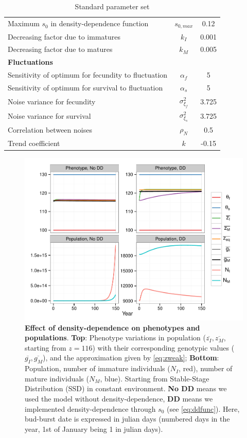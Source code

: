 \documentclass[a4paper, 12pt]{article}
\begin{document}
\begin{table}
\begin{center}
\begin{tabular}{l c c}
		Maximum $s_{0}$ in density-dependence function & $s_{0, max}$ & 0.12 \\
		Decreasing factor due to immatures & $k_{I}$ & 0.001 \\
		Decreasing factor due to matures & $k_{M}$ & 0.005 \\
		\multicolumn{3}{l}{\textbf{Fluctuations}} \\
		Sensitivity of optimum for fecundity to fluctuation & $\alpha_{f}$ & 5 \\
		Sensitivity of optimum for survival to fluctuation & $\alpha_{s}$ & 5 \\
		Noise variance for fecundity & $\sigma_{\xi_{f}}^2$ & 3.725 \\
		Noise variance for survival & $\sigma_{\xi_{s}}^2$ & 3.725 \\
		Correlation between noises & $\rho_{N}$ & 0.5 \\
		Trend coefficient & $k$ & -0.15 \\
		\hline \hline
	\end{tabular}
	\caption{Standard parameter set}
	\label{tab:params}
\end{center}
\end{table}

\begin{figure}[ht!]
	\centering
	\includegraphics[scale=1]{Figures/DDphenopop.pdf}
	\caption{\textbf{Effect of density-dependence on phenotypes and populations}. \textbf{Top}: Phenotype variations in population ($\overline{z_I}, \overline{z_M}$, starting from $z = 116$) with their corresponding genotypic values ($\overline{g_I}, \overline{g_M}$), and the approximation given by \autoref{eq:zweak}; \textbf{Bottom}: Population, number of immature individuals ($N_I$, red), number of mature individuals ($N_M$, blue). Starting from Stable-Stage Distribution (SSD) in constant environment. \textbf{No DD} means we used the model without density-dependence, \textbf{DD} means we implemented density-dependence through $s_0$ (see \autoref{eq:ddfunc}). Here, bud-burst date is expressed in julian days (numbered days in the year, 1st of January being 1 in julian days).}
	\label{fig:dd}
\end{figure}
\end{document}
